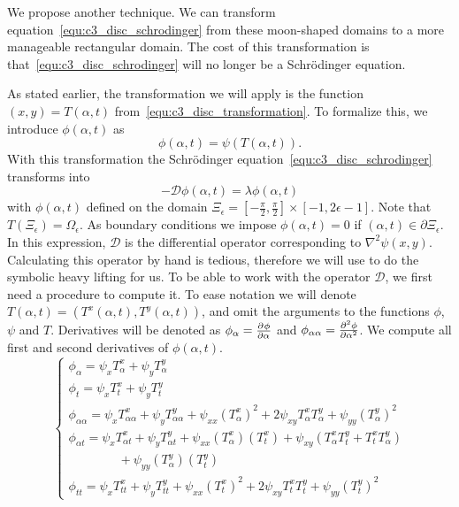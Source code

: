We propose another technique. We can transform equation~\eqref{equ:c3_disc_schrodinger} from these moon-shaped domains to a more manageable rectangular domain. The cost of this transformation is that~\eqref{equ:c3_disc_schrodinger} will no longer be a Schrödinger equation.

As stated earlier, the transformation we will apply is the function $(x, y) = T(\alpha, t)$ from~\eqref{equ:c3_disc_transformation}. To formalize this, we introduce $\phi(\alpha, t)$ as
$$
  \phi(\alpha, t) = \psi(T(\alpha, t))\text{.}
$$
With this transformation the Schrödinger equation~\eqref{equ:c3_disc_schrodinger} transforms into
\begin{equation}\label{equ:c3_disc_schrodinger_transformed}
  -\mathcal{D}\phi(\alpha, t) = \lambda\phi(\alpha, t)
\end{equation}
with $\phi(\alpha, t)$ defined on the domain $\Xi_\epsilon = \left[-\frac{\pi}{2}, \frac{\pi}{2}\right] \times [-1, 2\epsilon - 1]$. Note that $T(\Xi_\epsilon) = \Omega_\epsilon$. As boundary conditions we impose $\phi(\alpha, t) = 0$ if $(\alpha, t) \in \partial\Xi_\epsilon$. In this expression, $\mathcal{D}$ is the differential operator corresponding to $\nabla^2\psi(x, y)$. Calculating this operator by hand is tedious, therefore we will use \sage{} to do the symbolic heavy lifting for us. To be able to work with the operator $\mathcal{D}$, we first need a procedure to compute it. To ease notation we will denote $T(\alpha, t) = (T^{x}(\alpha, t), T^{y}(\alpha, t))$, and omit the arguments to the functions $\phi$, $\psi$ and $T$. Derivatives will be denoted as $\phi_\alpha = \pdv[]{\phi}{\alpha}$ and $\phi_{\alpha\alpha} = \pdv[2]{\phi}{\alpha}$. We compute all first and second derivatives of $\phi(\alpha, t)$.
\begin{equation}\label{equ:disc_transformation_derivatives}
  \begin{cases}
    \phi_\alpha = \psi_x T^x_\alpha + \psi_y T^y_\alpha                                                                                                                   \\
    \phi_t = \psi_x T^x_t + \psi_y T^y_t                                                                                                                                  \\
    \phi_{\alpha\alpha} = \psi_x T^x_{\alpha\alpha} + \psi_y T^y_{\alpha\alpha} + \psi_{xx} (T^x_\alpha)^2 + 2 \psi_{xy} T^x_\alpha T^y_\alpha + \psi_{yy} (T^y_\alpha)^2 \\
    \phi_{\alpha t} = \psi_x T^x_{\alpha t} + \psi_y T^y_{\alpha t} + \psi_{xx} (T^x_\alpha)(T^x_t) + \psi_{xy} \left(T^x_\alpha T^y_t + T^x_t T^y_\alpha \right)         \\
    \quad\quad\quad\quad {} + \psi_{yy} (T^y_\alpha)(T^y_t)                                                                                                               \\
    \phi_{tt} = \psi_x T^x_{tt} + \psi_y T^y_{tt} + \psi_{xx} (T^x_t)^2 + 2 \psi_{xy} T^x_t T^y_t + \psi_{yy} (T^y_t)^2
  \end{cases}
\end{equation}

